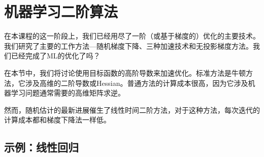 

\chapter{
    机器学习二阶算法
    }\label{sec:newton}


在本课程的这一阶段上，我们已经用尽了一阶（或基于梯度的）优化的主要技术。我们研究了主要的工作方法---随机梯度下降、三种加速技术和无投影梯度方法。我们已经完成了ML的优化了吗？

在本节中，我们将讨论使用目标函数的高阶导数来加速优化。标准方法是牛顿方法，它涉及高维的二阶导数或Hessian。普通方法的计算成本很高，因为它涉及机器学习问题通常需要的高维矩阵求逆。

然而，随机估计的最新进展催生了线性时间二阶方法，对于这种方法，每次迭代的计算成本都和梯度下降法一样低。


\section{
    示例：线性回归
    }

